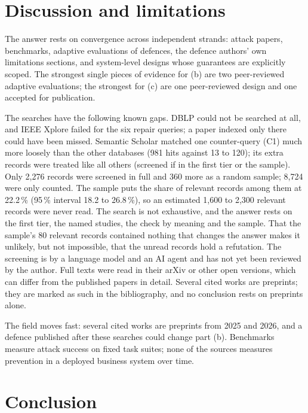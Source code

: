 \section{Discussion and limitations}
\label{prompt-injection:discussion}

The answer rests on convergence across independent strands: attack
papers, benchmarks, adaptive evaluations of defences, the defence authors'
own limitations sections, and system-level designs whose guarantees are
explicitly scoped. The strongest single pieces of evidence for (b) are two
peer-reviewed adaptive evaluations\autocite{Zhan2025Adaptive,Nasr2026AttackerSecond};
the strongest for (c) are one peer-reviewed design\autocite{Debenedetti2026CaMeL}
and one accepted for publication\autocite{Costa2026FIDES}.

The searches have the following known gaps. DBLP could not be searched
at all, and IEEE Xplore failed for the six repair queries; a paper
indexed only there could have been missed.
Semantic Scholar matched one counter-query (C1) much more loosely than
the other databases (981 hits against 13 to 120); its extra records were
treated like all others (screened if in the first tier or the sample). Only 2,276 records were screened in full and 360 more as a random
sample; 8,724 were only counted. The sample puts the share of relevant
records among them at 22.2\,\% (95\,\% interval 18.2 to 26.8\,\%), so an
estimated 1,600 to 2,300 relevant records were never read. The search is
not exhaustive, and the answer rests on the first tier, the named
studies, the check by meaning and the sample. That the sample's 80
relevant records contained nothing that changes the answer makes it
unlikely, but not impossible, that the unread records hold a refutation. The screening is by a
language model and an AI agent and has not yet been reviewed by the
author. Full texts were read in their arXiv or other open versions, which
can differ from the published papers in detail. Several cited works are
preprints; they are marked as such in the bibliography, and no conclusion
rests on preprints alone.

The field moves fast: several cited works are preprints from 2025 and
2026, and a defence published after these searches could change part
(b). Benchmarks measure attack success on fixed task suites; none of the
sources measures prevention in a deployed business system over time.

\section{Conclusion}
\label{prompt-injection:conclusion}

